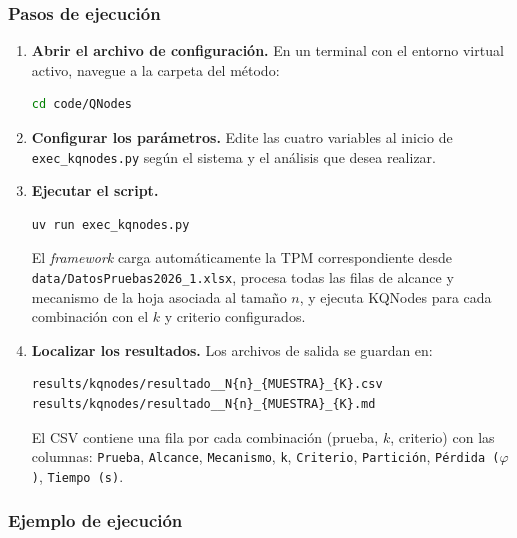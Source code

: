 \subsubsection{Pasos de ejecución}

\begin{enumerate}
  \item \textbf{Abrir el archivo de configuración.} En un terminal con el entorno
        virtual activo, navegue a la carpeta del método:
\begin{lstlisting}[language=bash]
cd code/QNodes
\end{lstlisting}

  \item \textbf{Configurar los parámetros.} Edite las cuatro variables al inicio de
        \texttt{exec\_kqnodes.py} según el sistema y el análisis que desea realizar.

  \item \textbf{Ejecutar el script.}
\begin{lstlisting}[language=bash]
uv run exec_kqnodes.py
\end{lstlisting}
        El \textit{framework} carga automáticamente la TPM correspondiente desde
        \texttt{data/DatosPruebas2026\_1.xlsx}, procesa todas las filas de alcance y
        mecanismo de la hoja asociada al tamaño $n$, y ejecuta KQNodes para cada
        combinación con el $k$ y criterio configurados.

  \item \textbf{Localizar los resultados.} Los archivos de salida se guardan en:
\begin{lstlisting}
results/kqnodes/resultado__N{n}_{MUESTRA}_{K}.csv
results/kqnodes/resultado__N{n}_{MUESTRA}_{K}.md
\end{lstlisting}
        El CSV contiene una fila por cada combinación
        (prueba, $k$, criterio) con las columnas:
        \texttt{Prueba}, \texttt{Alcance}, \texttt{Mecanismo}, \texttt{k},
        \texttt{Criterio}, \texttt{Partición}, \texttt{Pérdida ($\varphi$)},
        \texttt{Tiempo (s)}.
\end{enumerate}

\subsubsection{Ejemplo de ejecución}

